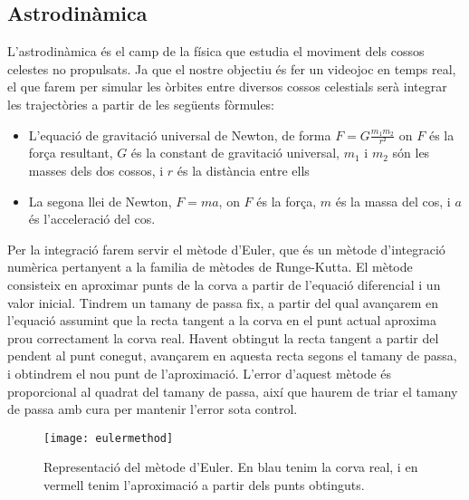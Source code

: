 \subsection{Astrodinàmica}
L'astrodinàmica és el camp de la física que estudia el moviment dels cossos celestes no propulsats. Ja que el nostre objectiu és fer un videojoc en temps real, el que farem per simular les òrbites entre diversos cossos celestials serà integrar les trajectòries a partir de les següents fòrmules:
\begin{itemize}
  \item L'equació de gravitació universal de Newton, de forma $F=G\frac{m_{1}m_{2}}{r²}$ on $F$ és la força resultant, $G$ és la constant de gravitació universal, $m_{1}$ i $m_{2}$ són les masses dels dos cossos, i $r$ és la distància entre ells
  \item La segona llei de Newton, $F=ma$, on $F$ és la força, $m$ és la massa del cos, i $a$ és l'acceleració del cos.
\end{itemize}
Per la integració farem servir el mètode d'Euler, que és un mètode d'integració numèrica pertanyent a la familia de mètodes de Runge-Kutta.
El mètode consisteix en aproximar punts de la corva a partir de l'equació diferencial i un valor inicial. Tindrem un tamany de passa fix, a partir del qual avançarem en l'equació assumint que la recta tangent a la corva en el punt actual aproxima prou correctament la corva real. Havent obtingut la recta tangent a partir del pendent al punt conegut, avançarem en aquesta recta segons el tamany de passa, i obtindrem el nou punt de l'aproximació. L'error d'aquest mètode és proporcional al quadrat del tamany de passa, així que haurem de triar el tamany de passa amb cura per mantenir l'error sota control.

\begin{figure}[h]
  \centering
  \texttt{[image: eulermethod]}
  \caption{Representació del mètode d'Euler. En blau tenim la corva real, i en vermell tenim l'aproximació a partir dels punts obtinguts.}
\end{figure}
